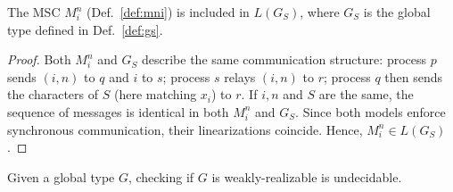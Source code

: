 \bigskip

\begin{lemma}\label{lemma:msgs}
	The MSC $M^n_i$ (Def.~\ref{def:mni}) is included in $L(G_S)$, where $G_S$
	is the global type defined in Def.~\ref{def:gs}.
\end{lemma}

\begin{proof}
	Both $M^n_i$ and $G_S$ describe the same communication structure:
	process $p$ sends $(i,n)$ to $q$ and $i$ to $s$;
	process $s$ relays $(i,n)$ to $r$;
	process $q$ then sends the characters of $S$ (here matching $x_i$) to $r$.
	If $i,n$ and $S$ are the same, the sequence of messages is identical in both 
	$M^n_i$ and $G_S$. Since both models enforce synchronous communication, 
	their linearizations coincide. Hence, $M^n_i \in L(G_S)$.
\end{proof}

\bigskip

\begin{theorem}\label{thm:main}
	Given a global type $G$, checking if $G$ is weakly-realizable is undecidable.
\end{theorem}

